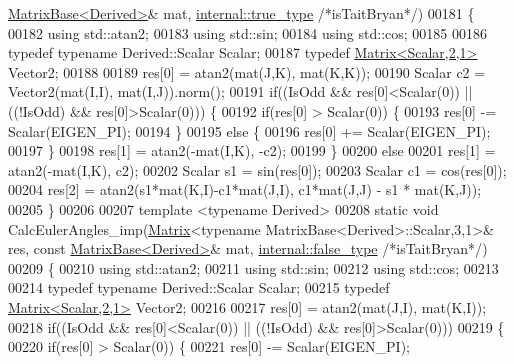 \begin{DoxyCode}
      \hyperlink{group___core___module_class_eigen_1_1_matrix_base}{MatrixBase<Derived>}& mat, \hyperlink{struct_eigen_1_1internal_1_1true__type}{internal::true\_type} \textcolor{comment}{/*isTaitBryan*/})
00181     \{
00182       \textcolor{keyword}{using} std::atan2;
00183       \textcolor{keyword}{using} std::sin;
00184       \textcolor{keyword}{using} std::cos;
00185       
00186       \textcolor{keyword}{typedef} \textcolor{keyword}{typename} Derived::Scalar Scalar;
00187       \textcolor{keyword}{typedef} \hyperlink{group___core___module_class_eigen_1_1_matrix}{Matrix<Scalar,2,1>} Vector2;
00188       
00189       res[0] = atan2(mat(J,K), mat(K,K));
00190       Scalar c2 = Vector2(mat(I,I), mat(I,J)).norm();
00191       \textcolor{keywordflow}{if}((IsOdd && res[0]<Scalar(0)) || ((!IsOdd) && res[0]>Scalar(0))) \{
00192         \textcolor{keywordflow}{if}(res[0] > Scalar(0)) \{
00193           res[0] -= Scalar(EIGEN\_PI);
00194         \}
00195         \textcolor{keywordflow}{else} \{
00196           res[0] += Scalar(EIGEN\_PI);
00197         \}
00198         res[1] = atan2(-mat(I,K), -c2);
00199       \}
00200       \textcolor{keywordflow}{else}
00201         res[1] = atan2(-mat(I,K), c2);
00202       Scalar s1 = sin(res[0]);
00203       Scalar c1 = cos(res[0]);
00204       res[2] = atan2(s1*mat(K,I)-c1*mat(J,I), c1*mat(J,J) - s1 * mat(K,J));
00205     \}
00206 
00207     \textcolor{keyword}{template} <\textcolor{keyword}{typename} Derived>
00208     \textcolor{keyword}{static} \textcolor{keywordtype}{void} CalcEulerAngles\_imp(\hyperlink{group___core___module_class_eigen_1_1_matrix}{Matrix}<\textcolor{keyword}{typename} MatrixBase<Derived>::Scalar,3,1>& res, \textcolor{keyword}{const} 
      \hyperlink{group___core___module_class_eigen_1_1_matrix_base}{MatrixBase<Derived>}& mat, \hyperlink{struct_eigen_1_1internal_1_1false__type}{internal::false\_type} \textcolor{comment}{/*isTaitBryan*/})
00209     \{
00210       \textcolor{keyword}{using} std::atan2;
00211       \textcolor{keyword}{using} std::sin;
00212       \textcolor{keyword}{using} std::cos;
00213 
00214       \textcolor{keyword}{typedef} \textcolor{keyword}{typename} Derived::Scalar Scalar;
00215       \textcolor{keyword}{typedef} \hyperlink{group___core___module_class_eigen_1_1_matrix}{Matrix<Scalar,2,1>} Vector2;
00216       
00217       res[0] = atan2(mat(J,I), mat(K,I));
00218       \textcolor{keywordflow}{if}((IsOdd && res[0]<Scalar(0)) || ((!IsOdd) && res[0]>Scalar(0)))
00219       \{
00220         \textcolor{keywordflow}{if}(res[0] > Scalar(0)) \{
00221           res[0] -= Scalar(EIGEN\_PI);

\end{DoxyCode}
